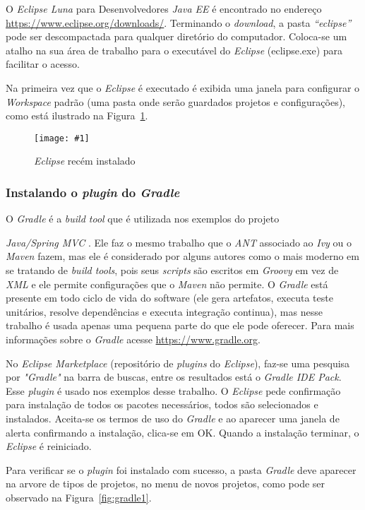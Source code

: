 \documentclass[a4paper,12pt]{article}
\newcommand{\spring} {
\est{Java/Spring MVC}
}
\newcommand{\figura}[3] {
	\begin{figure}[ht]
		\centering
		\texttt{[image: \#1]}
		\caption{#2}
		\label{#3}
	\end{figure}
	\FloatBarrier
}
\newcommand{\est}[1] {
\textit{#1}}
\newcommand{\sigla}[1] {
\textit{#1}}
\newcommand{\lang}[1] {
\textit{#1}}
\begin{document}
O \est{Eclipse Luna} para Desenvolvedores \est{Java EE} é encontrado no endereço \url{https://www.eclipse.org/downloads/}. Terminando o \est{download}, a pasta \est{“eclipse”} pode ser descompactada para qualquer diretório do computador. Coloca-se um atalho na sua área de trabalho para o executável do \est{Eclipse} (eclipse.exe) para facilitar o acesso.

Na primeira vez que o \est{Eclipse} é executado é exibida uma janela para configurar o \est{Workspace} padrão (uma pasta onde serão guardados projetos e configurações), como está ilustrado na Figura~\ref{fig:eclipse1}.

\figura{eclipse1.png}{\est{Eclipse} recém instalado}{fig:eclipse1}

\subsubsection{Instalando o \est{plugin} do \est{Gradle}} 

O \est{Gradle} é a \est{build tool} que é utilizada nos exemplos do projeto \spring. Ele faz o mesmo trabalho que o \est{ANT} associado ao \est{Ivy} ou o \est{Maven} fazem, mas ele é considerado por alguns autores como o mais moderno em se tratando de \est{build tools}, pois seus \est{scripts} são escritos em \lang{Groovy} em vez de \sigla{XML} e ele permite configurações que o \est{Maven} não permite. O \est{Gradle} está presente em todo ciclo de vida do software (ele gera artefatos, executa teste unitários, resolve dependências e executa integração continua), mas nesse trabalho é usada apenas uma pequena parte do que ele pode oferecer. Para mais informações sobre o \est{Gradle} acesse \url{https://www.gradle.org}. 

No \est{Eclipse Marketplace} (repositório de \est{plugins} do \est{Eclipse}), faz-se uma pesquisa por \est{"Gradle"} na barra de buscas, entre os resultados está o \est{Gradle IDE Pack}. Esse \est{plugin} é usado nos exemplos desse trabalho. O \est{Eclipse} pede confirmação para instalação de todos os pacotes necessários, todos são selecionados e instalados. Aceita-se os termos de uso do \est{Gradle} e ao aparecer uma janela de alerta confirmando a instalação, clica-se em OK. Quando a instalação terminar, o \est{Eclipse} é reiniciado.

Para verificar se o \est{plugin} foi instalado com sucesso, a pasta \est{Gradle} deve aparecer na arvore de tipos de projetos, no menu de novos projetos, como pode ser observado na Figura~\ref{fig:gradle1}.
\end{document}
